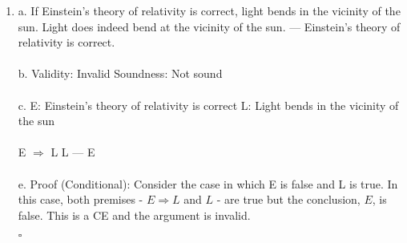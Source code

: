 \documentclass[]{article}
\begin{document}
\begin{enumerate}
    \item a.
    \newline If Einstein's theory of relativity is correct, light bends in the vicinity of the sun.
    \newline
    Light does indeed bend at the vicinity of the sun.
    \newline
    ---
    \newline
    Einstein's theory of relativity is correct.
    \\\\b.
    Validity: Invalid
    \newline
    Soundness: Not sound
    \\\\c.
    \newline E: Einstein's theory of relativity is correct
    \newline L: Light bends in the vicinity of the sun
    \\\\ E $\Rightarrow$ L
    \newline L
    \newline ---
    \newline E
    \\\\e.
    \newline Proof (Conditional):
    \newline Consider the case in which E is false and L is true. In this case, both premises - $E \Rightarrow L$ and $L$ - are true but the conclusion, $E$, is false. This is a CE and the argument is invalid.
    \begin{flushright}
    $\square$
    \end{flushright}
    

\end{enumerate}
\end{document}
